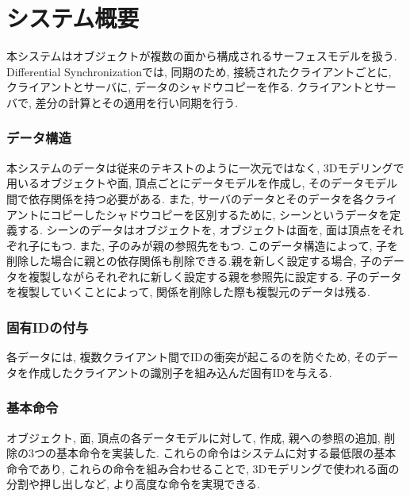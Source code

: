 \chapter{システム概要}
本システムはオブジェクトが複数の面から構成されるサーフェスモデルを扱う. Differential Synchronizationでは, 同期のため, 接続されたクライアントごとに, クライアントとサーバに, データのシャドウコピーを作る. クライアントとサーバで, 差分の計算とその適用を行い同期を行う.
 \subsection{データ構造}
 本システムのデータは従来のテキストのように一次元ではなく, 3Dモデリングで用いるオブジェクトや面, 頂点ごとにデータモデルを作成し, そのデータモデル間で依存関係を持つ必要がある.
 また, サーバのデータとそのデータを各クライアントにコピーしたシャドウコピーを区別するために, シーンというデータを定義する.
 シーンのデータはオブジェクトを, オブジェクトは面を, 面は頂点をそれぞれ子にもつ. また, 子のみが親の参照先をもつ.
 このデータ構造によって, 子を削除した場合に親との依存関係も削除できる.親を新しく設定する場合, 子のデータを複製しながらそれぞれに新しく設定する親を参照先に設定する.
 子のデータを複製していくことによって, 関係を削除した際も複製元のデータは残る.
 \subsection{固有IDの付与}
 各データには, 複数クライアント間でIDの衝突が起こるのを防ぐため, そのデータを作成したクライアントの識別子を組み込んだ固有IDを与える.
 \subsection{基本命令}
 オブジェクト, 面, 頂点の各データモデルに対して, 作成, 親への参照の追加, 削除の3つの基本命令を実装した.
 これらの命令はシステムに対する最低限の基本命令であり, これらの命令を組み合わせることで, 3Dモデリングで使われる面の分割や押し出しなど, より高度な命令を実現できる.
